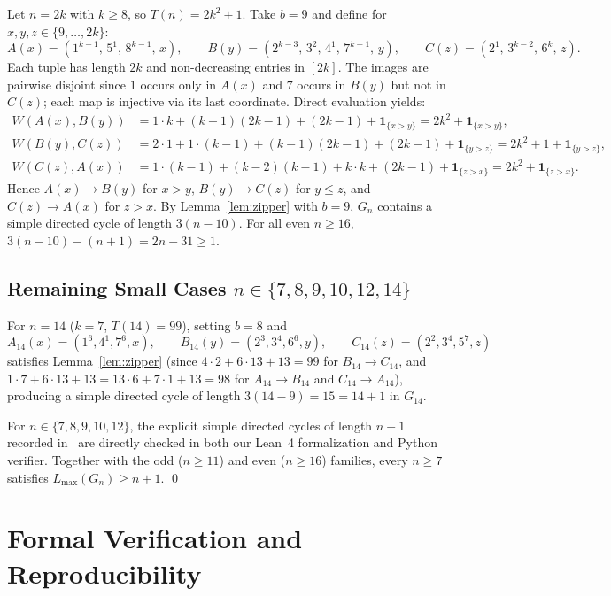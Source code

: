 \documentclass[11pt]{article}
\begin{document}
Let $n = 2k$ with $k \ge 8$, so $T(n) = 2k^2 + 1$. Take $b = 9$ and define for $x, y, z \in \{9,\dots,2k\}$:
\[
  A(x) = (1^{k-1},\, 5^1,\, 8^{k-1},\, x), \qquad
  B(y) = (2^{k-3},\, 3^2,\, 4^1,\, 7^{k-1},\, y), \qquad
  C(z) = (2^1,\, 3^{k-2},\, 6^k,\, z).
\]
Each tuple has length $2k$ and non-decreasing entries in $[2k]$. The images are pairwise disjoint since $1$ occurs only in $A(x)$ and $7$ occurs in $B(y)$ but not in $C(z)$; each map is injective via its last coordinate. Direct evaluation yields:
\begin{align*}
  W(A(x), B(y)) &= 1 \cdot k + (k-1)(2k-1) + (2k-1) + \mathbf{1}_{\{x > y\}} = 2k^2 + \mathbf{1}_{\{x > y\}}, \\
  W(B(y), C(z)) &= 2 \cdot 1 + 1 \cdot (k-1) + (k-1)(2k-1) + (2k-1) + \mathbf{1}_{\{y > z\}} = 2k^2 + 1 + \mathbf{1}_{\{y > z\}}, \\
  W(C(z), A(x)) &= 1 \cdot (k-1) + (k-2)(k-1) + k \cdot k + (2k-1) + \mathbf{1}_{\{z > x\}} = 2k^2 + \mathbf{1}_{\{z > x\}}.
\end{align*}
Hence $A(x) \to B(y)$ for $x > y$, $B(y) \to C(z)$ for $y \le z$, and $C(z) \to A(x)$ for $z > x$. By Lemma~\ref{lem:zipper} with $b = 9$, $G_n$ contains a simple directed cycle of length $3(n - 10)$. For all even $n \ge 16$, $3(n - 10) - (n + 1) = 2n - 31 \ge 1$.

\subsection{Remaining Small Cases $n \in \{7, 8, 9, 10, 12, 14\}$}

For $n = 14$ ($k = 7$, $T(14) = 99$), setting $b = 8$ and
\[
  A_{14}(x) = (1^6, 4^1, 7^6, x), \qquad
  B_{14}(y) = (2^3, 3^4, 6^6, y), \qquad
  C_{14}(z) = (2^2, 3^4, 5^7, z)
\]
satisfies Lemma~\ref{lem:zipper} (since $4 \cdot 2 + 6 \cdot 13 + 13 = 99$ for $B_{14} \to C_{14}$, and $1 \cdot 7 + 6 \cdot 13 + 13 = 13 \cdot 6 + 7 \cdot 1 + 13 = 98$ for $A_{14} \to B_{14}$ and $C_{14} \to A_{14}$), producing a simple directed cycle of length $3(14 - 9) = 15 = 14 + 1$ in $G_{14}$.

For $n \in \{7, 8, 9, 10, 12\}$, the explicit simple directed cycles of length $n + 1$ recorded in~\cite[Examplemmas~1--2]{easlick2026} are directly checked in both our Lean~4 formalization and Python verifier. Together with the odd ($n \ge 11$) and even ($n \ge 16$) families, every $n \ge 7$ satisfies $L_{\max}(G_n) \ge n + 1$. \qed

\section{Formal Verification and Reproducibility}
\end{document}
